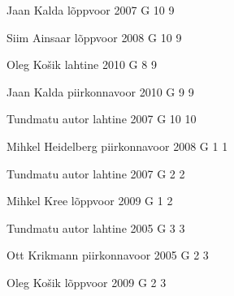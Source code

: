 \documentclass[11pt]{article}
\begin{document}
{Jaan Kalda} %
{lõppvoor} %
{2007} %
{G 10} %
{9} %
{

\ifEngHint
\fi
}

{Siim Ainsaar} %
{lõppvoor} %
{2008} %
{G 10} %
{9} %
{

\ifEngHint
\fi
}

{Oleg Košik} %
{lahtine} %
{2010} %
{G 8} %
{9} %
{

\ifEngHint
\fi
}

{Jaan Kalda} %
{piirkonnavoor} %
{2010} %
{G 9} %
{9} %
{

\ifEngHint
\fi
}

{Tundmatu autor} %
{lahtine} %
{2007} %
{G 10} %
{10} %
{

\ifEngHint
\fi
}

{Mihkel Heidelberg} %
{piirkonnavoor} %
{2008} %
{G 1} %
{1} %
{

\ifEngHint
\fi
}

{Tundmatu autor} %
{lahtine} %
{2007} %
{G 2} %
{2} %
{

\ifEngHint
\fi
}

{Mihkel Kree} %
{lõppvoor} %
{2009} %
{G 1} %
{2} %
{

\ifEngHint
\fi
}

{Tundmatu autor} %
{lahtine} %
{2005} %
{G 3} %
{3} %
{

\ifEngHint
\fi
}

{Ott Krikmann} %
{piirkonnavoor} %
{2005} %
{G 2} %
{3} %
{

\ifEngHint
\fi
}

{Oleg Košik} %
{lõppvoor} %
{2009} %
{G 2} %
{3} %
{

\ifEngHint
\fi
}
\end{document}
